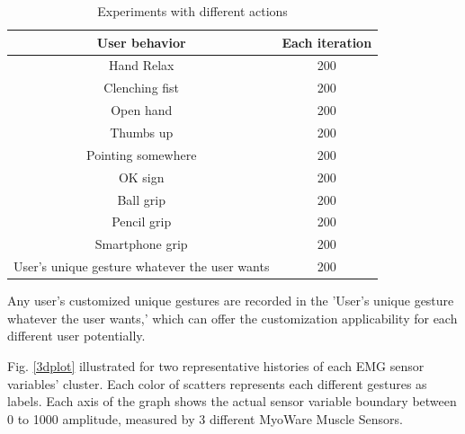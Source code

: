 \documentclass[conference]{IEEEtran}
\begin{document}
\begin{table}[ht]
\caption{Experiments with different actions} %
\centering %
\begin{tabular}{c c} %
\hline\hline %
User behavior & Each iteration \\ [0.5ex] %
\hline %
Hand Relax & 200 \\ %
Clenching fist & 200 \\
Open hand & 200 \\
Thumbs up & 200 \\
Pointing somewhere & 200 \\
OK sign & 200 \\
Ball grip & 200 \\
Pencil grip & 200 \\
Smartphone grip & 200 \\
User's unique gesture whatever the user wants & 200 \\ [1ex] %
\hline %
\end{tabular}
\label{table:nonlin} %
\end{table}

Any user's customized unique gestures are recorded in the 'User's unique gesture whatever the user wants,' which can offer the customization applicability for each different user potentially.



Fig. \ref{3dplot} illustrated for two representative histories of each EMG sensor variables' cluster. Each color of scatters represents each different gestures as labels. Each axis of the graph shows the actual sensor variable boundary between 0 to 1000 amplitude, measured by 3 different MyoWare Muscle Sensors. 
\end{document}
